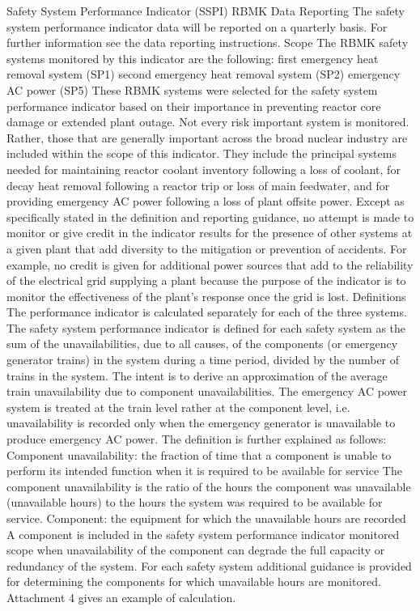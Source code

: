 Safety System Performance Indicator (SSPI) RBMK
Data Reporting
The safety system performance indicator data will be reported on a quarterly basis. For further information see the data reporting instructions.
Scope
The RBMK safety systems monitored by this indicator are the following:
first emergency heat removal system (SP1)
second emergency heat removal system (SP2)
emergency AC power (SP5)
These RBMK systems were selected for the safety system performance indicator based on their importance in preventing reactor core damage or extended plant outage. Not every risk important system is monitored. Rather, those that are generally important across the broad nuclear industry are included within the scope of this indicator. They include the principal systems needed for maintaining reactor coolant inventory following a loss of coolant, for decay heat removal following a reactor trip or loss of main feedwater, and for providing emergency AC power following a loss of plant offsite power.
Except as specifically stated in the definition and reporting guidance, no attempt is made to monitor or give credit in the indicator results for the presence of other systems at a given plant that add diversity to the mitigation or prevention of accidents. For example, no credit is given for additional power sources that add to the reliability of the electrical grid supplying a plant because the purpose of the indicator is to monitor the effectiveness of the plant's response once the grid is lost.
Definitions
The performance indicator is calculated separately for each of the three systems. The safety system performance indicator is defined for each safety system as the sum of the unavailabilities, due to all causes, of the components (or emergency generator trains) in the system during a time period, divided by the number of trains in the system. The intent is to derive an approximation of the average train unavailability due to component unavailabilities. The emergency AC power system is treated at the train level rather at the component level, i.e. unavailability is recorded only when the emergency generator is unavailable to produce emergency AC power. The definition is further explained as follows:
Component unavailability: the fraction of time that a component is unable to perform its intended function when it is required to be available for service
The component unavailability is the ratio of the hours the component was unavailable (unavailable hours) to the hours the system was required to be available for service.
Component: the equipment for which the unavailable hours are recorded
A component is included in the safety system performance indicator monitored scope when unavailability of the component can degrade the full capacity or redundancy of the system. For each safety system additional guidance is provided for determining the components for which unavailable hours are monitored. Attachment 4 gives an example of calculation.

